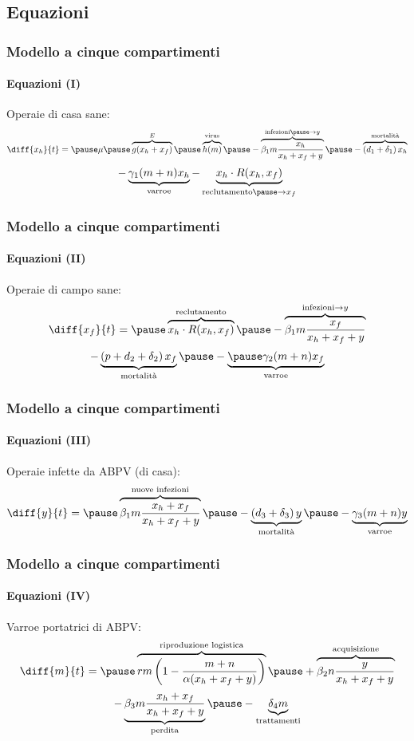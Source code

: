 \documentclass[]{beamer}
\begin{document}
\subsection{Equazioni}

\begin{frame}
    \frametitle{Modello a cinque compartimenti}
    \framesubtitle{Equazioni (I)}

    Operaie di casa sane:
    $$ \diff{x_h}{t} = \pause \mu \pause \overbrace{ g( x_h + x_f ) }^{E} %
        \pause \overbrace{ h(m) }^{\text{virus}} %
        \pause - \overbrace{ \beta_1 m \frac{x_h}{x_h + x_f + y} }^{\text{infezioni} \pause \to y} %
        \pause - \overbrace{ \left( d_1 + \delta_1 \right) x_h }^{\text{mortalità}} $$
    \pause
    $$ - \underbrace{ \gamma_1 (m+n) x_h }_{\text{varroe}} %
        - \underbrace{ x_h \cdot R(x_h, x_f) }_{\text{reclutamento} \pause \to x_f}  $$
\end{frame}

\begin{frame}
    \frametitle{Modello a cinque compartimenti}
    \framesubtitle{Equazioni (II)}

    Operaie di campo sane:
    $$ \diff{x_f}{t} = \pause \overbrace{ x_h \cdot R(x_h, x_f) }^{\text{reclutamento}} %
    \pause - \overbrace{ \beta_1 m \frac{x_f}{x_h + x_f + y} }^{\text{infezioni} \to y}$$
    \pause
    $$ - \underbrace{\left( p + d_2 + \delta_2 \right) x_f}_{\text{mortalità}} %
    \pause - \underbrace{ \pause \gamma_2 (m+n) x_f }_{\text{varroe}}$$
\end{frame}

\begin{frame}
    \frametitle{Modello a cinque compartimenti}
    \framesubtitle{Equazioni (III)}

    Operaie infette da ABPV (di casa):
    $$\diff{y}{t} = \pause \overbrace{ \beta_1 m \frac{x_h + x_f}{x_h + x_f + y} }^{\text{nuove infezioni}} %
    \pause - \underbrace{ \left( d_3 + \delta_3 \right) y }_{\text{mortalità}} %
    \pause - \underbrace{ \gamma_3 (m+n) y }_{\text{varroe}}$$
\end{frame}

\begin{frame}
    \frametitle{Modello a cinque compartimenti}
    \framesubtitle{Equazioni (IV)}

    Varroe portatrici di ABPV:
    $$\diff{m}{t} = \pause \overbrace{ rm \left( 1 - \frac{m+n}{ \alpha (x_h + x_f + y) } \right) %
        }^{\text{riproduzione logistica}}%
        \pause + \overbrace{ \beta_2 n \frac{y}{x_h + x_f + y} }^{\text{acquisizione}}$$
    \pause
    $$- \underbrace{ \beta_3 m \frac{x_h + x_f}{x_h + x_f + y} }_{\text{perdita}} %
        \pause -\underbrace{ \delta_4 m }_{\text{trattamenti}} $$
\end{frame}
\end{document}
